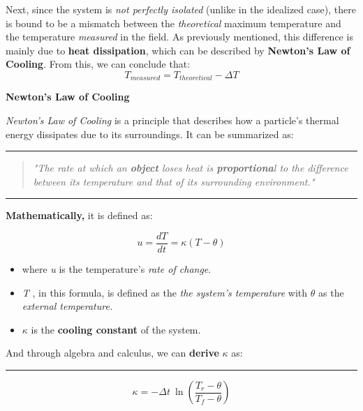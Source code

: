 \documentclass[12pt]{article}
\begin{document}
\vspace*{0.3cm}
Next, since the system is \textit{not perfectly isolated} (unlike in the idealized case), there is bound to be a mismatch between the \textit{theoretical} maximum temperature and the temperature \textit{measured} in the field. As previously mentioned, this difference is mainly due to\textbf{ heat dissipation}, which can be described by\textbf{ Newton’s Law of Cooling}. From this, we can conclude that: 
\[T_{measured}=T_{theoretical} -\Delta T\]

\vspace*{0.3cm}
\noindent
\textbf{Newton's Law of Cooling}
\vspace*{0.3cm}

\textit{Newton's Law of Cooling} is a principle that describes how a particle’s thermal energy dissipates due to its surroundings. It can be summarized as:
\vspace*{0.5cm}
\hrule
\vspace*{0.3cm}
\begin{quote}
    \textit{"The rate at which an \textbf{object} loses heat is \textbf{proportiona}l to the difference\textbf{ }between\textbf{ }its temperature and that of its surrounding environment."} 
\end{quote}
\vspace*{0.3cm}
\hrule
\vspace*{0.5cm}

\textbf{Mathematically,} it is defined as:

\[u=\frac{dT}{dt}=\kappa (T-\theta)\]

{\small
\begin{itemize}
    \item where \textit{u} is the temperature's \textit{rate of change}.
    \item \textit{T}  , in this formula, is defined as the\textit{ the system's temperature} with $\theta$ as the\textit{ external temperature.}
    \item $\kappa$ is the\textit{ }\textbf{cooling constant} of the system.
\end{itemize}
}

And through algebra and calculus, we can \textbf{derive} $\kappa$ as:
\vspace*{0.3cm}
\hrule
\vspace*{0.3cm}
\[\kappa=-\Delta t\ \ln(\frac{T_r-\theta}{T_f-\theta})\]
\end{document}
